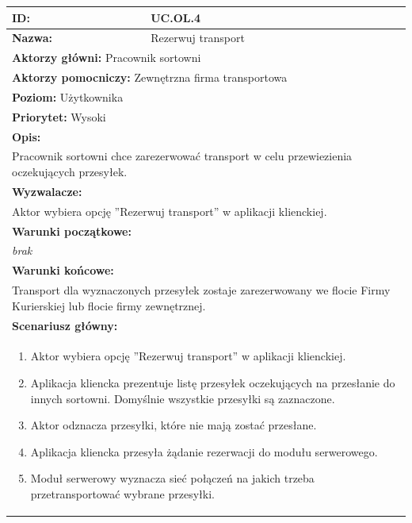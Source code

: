 \begin{center}
\begin{longtable}[h]{|p{1.6cm}|p{13.5cm}|}
\hline
\textbf{ID:} & UC.OL.4 \\ \hline
\textbf{Nazwa:} & Rezerwuj transport \\ \hline
\multicolumn{2}{|p{15.1cm}|}{\textbf{Aktorzy główni:} Pracownik sortowni} \\
\multicolumn{2}{|p{15.1cm}|}{\textbf{Aktorzy pomocniczy:} 
Zewnętrzna firma transportowa} \\
\multicolumn{2}{|p{15.1cm}|}{\textbf{Poziom:} Użytkownika} \\
\multicolumn{2}{|p{15.1cm}|}{\textbf{Priorytet:} Wysoki} \\
\hline
\multicolumn{2}{|p{15.1cm}|}{\textbf{Opis:}} \\
\multicolumn{2}{|p{15.1cm}|}{
Pracownik sortowni chce zarezerwować transport w celu przewiezienia oczekujących przesyłek.
} \\ \hline
\multicolumn{2}{|p{15.1cm}|}{\textbf{Wyzwalacze:}} \\
\multicolumn{2}{|p{15.1cm}|}{
Aktor wybiera opcję ''Rezerwuj transport'' w aplikacji klienckiej.
} \\ \hline
\multicolumn{2}{|p{15.1cm}|}{\textbf{Warunki początkowe:}} \\
\multicolumn{2}{|p{15.1cm}|}{
\textit{brak}
} \\ \hline
\multicolumn{2}{|p{15.1cm}|}{\textbf{Warunki końcowe:}} \\
\multicolumn{2}{|p{15.1cm}|}{
Transport dla wyznaczonych przesyłek zostaje zarezerwowany we flocie Firmy Kurierskiej lub flocie firmy zewnętrznej.
} \\ \hline
\multicolumn{2}{|p{15.1cm}|}{\textbf{Scenariusz główny:}} \\
\multicolumn{2}{|p{15.1cm}|}{
\begin{enumerate}
\item Aktor wybiera opcję ''Rezerwuj transport'' w aplikacji klienckiej.
\item Aplikacja kliencka prezentuje listę przesyłek oczekujących na przesłanie do innych sortowni. Domyślnie wszystkie przesyłki są zaznaczone.
\item Aktor odznacza przesyłki, które nie mają zostać przesłane.
\item Aplikacja kliencka przesyła żądanie rezerwacji do modułu serwerowego.
\item Moduł serwerowy wyznacza sieć połączeń na jakich trzeba przetransportować wybrane przesyłki.

\end{enumerate}}
\end{longtable}
\end{center}
